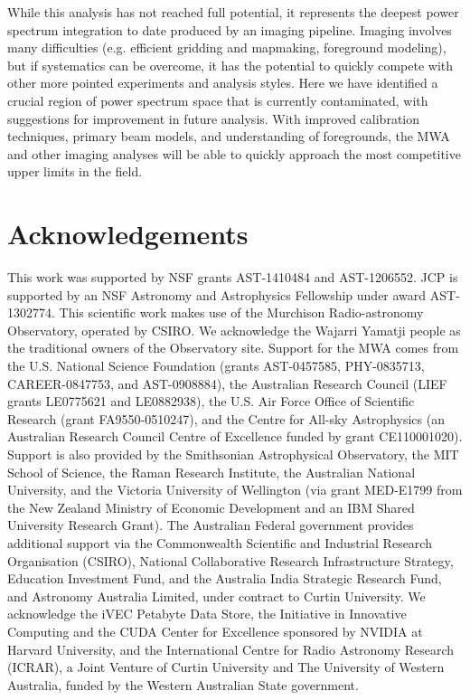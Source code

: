 \documentclass[iop]{emulateapj}
\begin{document}
While this analysis has not reached full potential, it represents the deepest power spectrum 
integration to date produced by an imaging pipeline. Imaging involves many difficulties (e.g. 
efficient gridding and mapmaking, foreground modeling), but if systematics can be 
overcome, it has the potential to quickly compete with other more pointed experiments and 
analysis styles. Here we have identified a crucial region of power spectrum space that is 
currently contaminated, with suggestions for improvement in future analysis. With improved 
calibration techniques, primary beam models, and understanding of foregrounds, the MWA 
and other imaging analyses will be able to quickly approach the most competitive upper 
limits in the field.

\section{Acknowledgements}
This work was supported by NSF grants AST-1410484 and AST-1206552.
JCP is supported by an NSF Astronomy and Astrophysics Fellowship under award 
AST-1302774. This scientific work makes use of the Murchison Radio-astronomy 
Observatory, operated by CSIRO. We acknowledge the Wajarri Yamatji people as the 
traditional owners of the Observatory site. Support for the MWA comes from the U.S. 
National Science Foundation (grants AST-0457585, PHY-0835713, CAREER-0847753, and 
AST-0908884), the Australian Research Council (LIEF grants LE0775621 and LE0882938), 
the U.S. Air Force Office of Scientific Research (grant FA9550-0510247), and the Centre for 
All-sky Astrophysics (an Australian Research Council Centre of Excellence funded by grant 
CE110001020). Support is also provided by the Smithsonian Astrophysical Observatory, the 
MIT School of Science, the Raman Research Institute, the Australian National University, 
and the Victoria University of Wellington (via grant MED-E1799 from the New Zealand 
Ministry of Economic Development and an IBM Shared University Research Grant). The 
Australian Federal government provides additional support via the Commonwealth Scientific 
and Industrial Research Organisation (CSIRO), National Collaborative Research 
Infrastructure Strategy, Education Investment Fund, and the Australia India Strategic 
Research Fund, and Astronomy Australia Limited, under contract to Curtin University. We 
acknowledge the iVEC Petabyte Data Store, the Initiative in Innovative Computing and the 
CUDA Center for Excellence sponsored by NVIDIA at Harvard University, and the 
International Centre for Radio Astronomy Research (ICRAR), a Joint Venture of Curtin 
University and The University of Western Australia, funded by the Western Australian State 
government.


\end{document}
